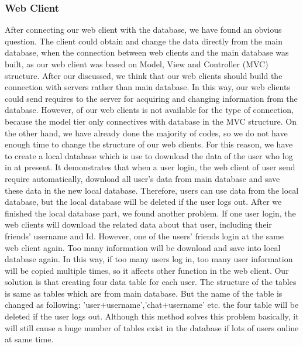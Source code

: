 \documentclass[a4paper,11pt]{article}
\begin{document}
\subsubsection{Web Client}
After connecting our web client with the database, we have found an obvious question. The client could obtain and change the data directly from the main database, when the connection between web clients and the main database was built, as our web client was based on Model, View and Controller (MVC) structure. After our discussed, we think that our web clients should build the connection with servers rather than main database. In this way, our web clients could send requires to the server for acquiring and changing information from the database. However, of our web clients is not available for the type of connection, because the model tier only connectives with database in the MVC structure. On the other hand, we have already done the majority of codes, so we do not have enough time to change the structure of our web clients. For this reason, we have to create a local database which is use to download the data of the user who log in at present. It demonstrates that when a user login, the web client of user send require automatically, download all user’s data from main database and save these data in the new local database. Therefore, users can use data from the local database, but the local database will be deleted if the user logs out. 
After we finished the local database part, we found another problem. If one user login, the web clients will download the related data about that user, including their friends’ username and Id. However, one of the users’ friends login at the same web client again. Too many information will be download and save into local database again. In this way, if too many users log in, too many user information will be copied multiple times, so it affects other function in the web client. Our solution is that creating four data table for each user. The structure of the tables is same as tables which are from main database. But the name of the table is changed as following: 'user+username','chat+username' etc. the four table will be deleted if the user logs out. Although this method solves this problem basically, it will still cause a huge number of tables exist in the database if lots of users online at same time.
\end{document}
